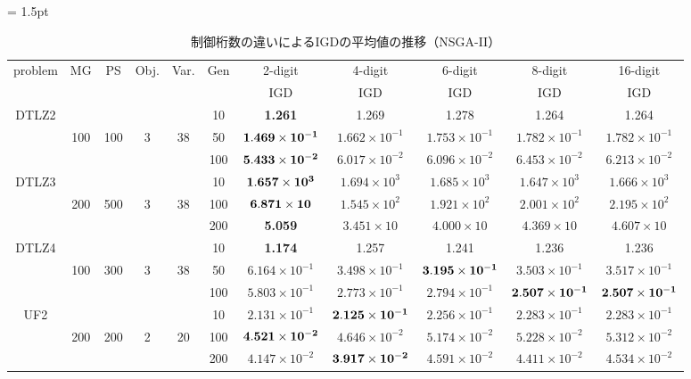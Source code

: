 \documentclass[../main/main]{subfiles}
\begin{document}
\begin{table}[htbp]
\fontsize{7.5pt}{7.5pt} \selectfont
\tabcolsep = 1.5pt
\centering
\caption{制御桁数の違いによるIGDの平均値の推移（NSGA-II）}
\label{tbl:igd_nsgaii}
\begin{tabular}{c|ccccc|c|c|c|c|c}
\hline 
problem & MG & PS & Obj. & Var. & Gen & 2-digit & 4-digit & 6-digit & 8-digit & 16-digit \\ 
\cline{7-11}
&&&&&&IGD&IGD&IGD&IGD&IGD\\
\hline
\multirow{3}{*}{DTLZ2} &  &&      &       & 10 & \bf{1.261} & 1.269 & 1.278 &  1.264 & 1.264\\
  				  &100 & 100 & 3 & 38 & 50 & $\bf{1.469 \times 10^{-1}}$ &  $1.662 \times 10^{-1}$ & $1.753 \times 10^{-1}$ & $1.782 \times 10^{-1}$ & $1.782 \times 10^{-1}$\\
				   &        &   &&     &100 & $\bf{5.433 \times 10^{-2}}$ & $6.017 \times 10^{-2}$ & $6.096 \times 10^{-2}$ & $6.453 \times 10^{-2}$ & $6.213 \times 10^{-2}$\\
\hline
\multirow{3}{*}{DTLZ3} &      &&  &       & 10 & $\bf{1.657 \times 10^{3}}$ & $1.694 \times 10^{3}$ &  $1.685 \times 10^{3}$ & $1.647 \times 10^{3}$ & $1.666 \times 10^{3}$\\
  				   &200 & 500 & 3 & 38 & 100 & $\bf{6.871 \times 10}$ & $1.545 \times 10^{2}$ &  $1.921 \times 10^{2}$ & $2.001 \times 10^{2}$ & $2.195 \times 10^{2}$\\
				   &        &      &&  &200 & \bf{5.059} & $3.451 \times 10$ &  $4.000 \times 10$ & $4.369 \times 10$ & $4.607 \times 10$\\

\hline
\multirow{3}{*}{DTLZ4} &   &&     &       & 10 & \bf{1.174} & 1.257 & 1.241 & 1.236 & 1.236\\
  				   &100 & 300  & 3 & 38 & 50 & $ 6.164 \times 10^{-1} $ & $3.498  \times 10^{-1}$ & $\bf{3.195  \times 10^{-1}}$ & $3.503  \times 10^{-1}$ & $3.517  \times 10^{-1}$\\
				   &        &     &&   &100 & $5.803 \times 10^{-1}$ & $2.773 \times 10^{-1}$ & $2.794 \times 10^{-1}$ & $\bf{2.507 \times 10^{-1}}$ & $\bf{2.507 \times 10 ^{-1}}$\\
\hline
\multirow{3}{*}{UF2} &        &     &&       & 10 & $2.131 \times 10^{-1}$ & $\bf{2.125 \times 10^{-1}}$ & $2.256 \times 10^{-1}$ & $2.283 \times 10^{-1}$ & $2.283 \times 10^{-1}$\\
  				   &200 & 200 & 2 & 20 & 100 & $\bf{4.521 \times 10^{-2}}$ & $4.646 \times 10^{-2}$ & $5.174 \times 10^{-2}$ & $5.228 \times 10^{-2}$ & $5.312 \times 10^{-2}$\\
				   &        &    &&    &200 & $4.147 \times 10^{-2}$ & $\bf{3.917 \times 10^{-2}}$ & $4.591 \times 10^{-2}$ & $4.411 \times 10^{-2}$ & $4.534 \times 10^{-2}$\\


\end{tabular}
\end{table}
\end{document}
